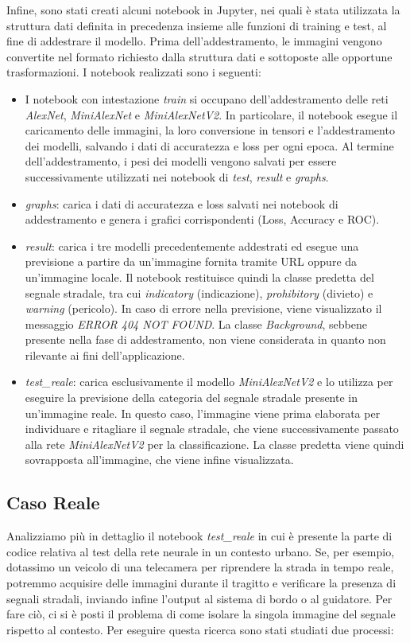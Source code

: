 Infine, sono stati creati alcuni notebook in Jupyter, nei quali è stata utilizzata la struttura dati definita in precedenza insieme alle funzioni di training e test, al fine di addestrare il modello. Prima dell'addestramento, le immagini vengono convertite nel formato richiesto dalla struttura dati e sottoposte alle opportune trasformazioni. I notebook realizzati sono i seguenti:
\begin{itemize}
    \item I notebook con intestazione \textit{train} si occupano dell'addestramento delle reti \textit{AlexNet}, \textit{MiniAlexNet} e \textit{MiniAlexNetV2}. In particolare, il notebook esegue il caricamento delle immagini, la loro conversione in tensori e l'addestramento dei modelli, salvando i dati di accuratezza e loss per ogni epoca. Al termine dell'addestramento, i pesi dei modelli vengono salvati per essere successivamente utilizzati nei notebook di \textit{test}, \textit{result} e \textit{graphs}.
    \item \textit{graphs}: carica i dati di accuratezza e loss salvati nei notebook di addestramento e genera i grafici corrispondenti (Loss, Accuracy e ROC).
    \item \textit{result}: carica i tre modelli precedentemente addestrati ed esegue una previsione a partire da un'immagine fornita tramite URL oppure da un'immagine locale. Il notebook restituisce quindi la classe predetta del segnale stradale, tra cui \textit{indicatory} (indicazione), \textit{prohibitory} (divieto) e \textit{warning} (pericolo). In caso di errore nella previsione, viene visualizzato il messaggio \textit{ERROR 404 NOT FOUND}. La classe \textit{Background}, sebbene presente nella fase di addestramento, non viene considerata in quanto non rilevante ai fini dell'applicazione.
    \item \textit{test\_reale}: carica esclusivamente il modello \textit{MiniAlexNetV2} e lo utilizza per eseguire la previsione della categoria del segnale stradale presente in un'immagine reale. In questo caso, l'immagine viene prima elaborata per individuare e ritagliare il segnale stradale, che viene successivamente passato alla rete \textit{MiniAlexNetV2} per la classificazione. La classe predetta viene quindi sovrapposta all'immagine, che viene infine visualizzata.
\end{itemize}

\subsection{Caso Reale}
Analizziamo più in dettaglio il notebook \textit{test\_reale} in cui è presente la parte di codice relativa al test della rete neurale in un contesto urbano. Se, per esempio, dotassimo un veicolo di una telecamera per riprendere la strada in tempo reale, potremmo acquisire delle immagini durante il tragitto e verificare la presenza di segnali stradali, inviando infine l'output al sistema di bordo o al guidatore. Per fare ciò, ci si è posti il problema di come isolare la singola immagine del segnale rispetto al contesto. Per eseguire questa ricerca sono stati studiati due processi:

